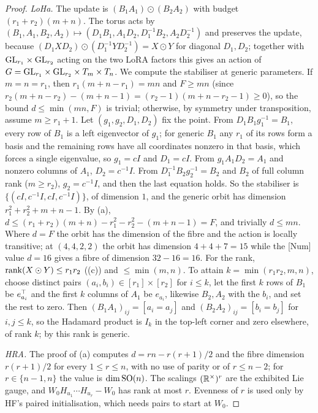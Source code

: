 \begin{proof}
\emph{LoHa.} The update is $(B_1A_1)\odot(B_2A_2)$ with budget $(r_1+r_2)(m+n)$. The torus acts by
$(B_1,A_1,B_2,A_2)\mapsto(D_1B_1,A_1D_2,D_1^{-1}B_2,A_2D_2^{-1})$ and preserves the update, because
$(D_1XD_2)\odot(D_1^{-1}YD_2^{-1})=X\odot Y$ for diagonal $D_1,D_2$; together with $\mathrm{GL}_{r_1}\times\mathrm{GL}_{r_2}$ acting on the two
LoRA factors this gives an action of $G=\mathrm{GL}_{r_1}\times\mathrm{GL}_{r_2}\times T_m\times T_n$. We compute the stabiliser at generic
parameters. If $m=n=r_1$, then $r_1(m+n-r_1)=mn$ and $F\ge mn$ (since $r_2(m+n-r_2)-(m+n-1)=(r_2-1)(m+n-r_2-1)\ge0$), so the
bound $d\le\min(mn,F)$ is trivial; otherwise, by symmetry under transposition, assume $m\ge r_1+1$. Let
$(g_1,g_2,D_1,D_2)$ fix the point. From $D_1B_1g_1^{-1}=B_1$, every row of $B_1$ is a left eigenvector of $g_1$; for generic
$B_1$ any $r_1$ of its rows form a basis and the remaining rows have all coordinates nonzero in that basis, which forces a
single eigenvalue, so $g_1=cI$ and $D_1=cI$. From $g_1A_1D_2=A_1$ and nonzero columns of $A_1$, $D_2=c^{-1}I$. From
$D_1^{-1}B_2g_2^{-1}=B_2$ and $B_2$ of full column rank ($m\ge r_2$), $g_2=c^{-1}I$, and then the last equation holds. So the
stabiliser is $\{(cI,c^{-1}I,cI,c^{-1}I)\}$, of dimension $1$, and the generic orbit has dimension
$r_1^2+r_2^2+m+n-1$. By (a), $d\le(r_1+r_2)(m+n)-r_1^2-r_2^2-(m+n-1)=F$, and trivially $d\le mn$. Where $d=F$ the orbit
has the dimension of the fibre and the action is locally transitive; at $(4,4,2,2)$ the orbit has dimension $4+4+7=15$ while
the [Num] value $d=16$ gives a fibre of dimension $32-16=16$. For the rank, $\operatorname{rank}(X\odot Y)\le r_1r_2$ ((c)) and
$\le\min(m,n)$. To attain $k=\min(r_1r_2,m,n)$, choose distinct pairs $(a_i,b_i)\in[r_1]\times[r_2]$ for $i\le k$, let the
first $k$ rows of $B_1$ be $e_{a_i}^{\top}$ and the first $k$ columns of $A_1$ be $e_{a_i}$, likewise $B_2,A_2$ with the $b_i$, and
set the rest to zero. Then $(B_1A_1)_{ij}=[a_i=a_j]$ and $(B_2A_2)_{ij}=[b_i=b_j]$ for $i,j\le k$, so the Hadamard product is
$I_k$ in the top-left corner and zero elsewhere, of rank $k$; by  this rank is generic.

\emph{HRA.} The proof of (a) computes $d=rn-r(r+1)/2$ and the fibre dimension $r(r+1)/2$ for every
$1\le r\le n$, with no use of parity or of $r\le n-2$; for $r\in\{n-1,n\}$ the value is $\dim\mathrm{SO}(n)$. The scalings
$(\mathbb{R}^\times)^r$ are the exhibited Lie gauge, and $W_0H_{u_1}\cdots H_{u_r}-W_0$ has rank at most $r$. Evenness of $r$ is used
only by HF's paired initialisation, which needs pairs to start at $W_0$.


\end{proof}
